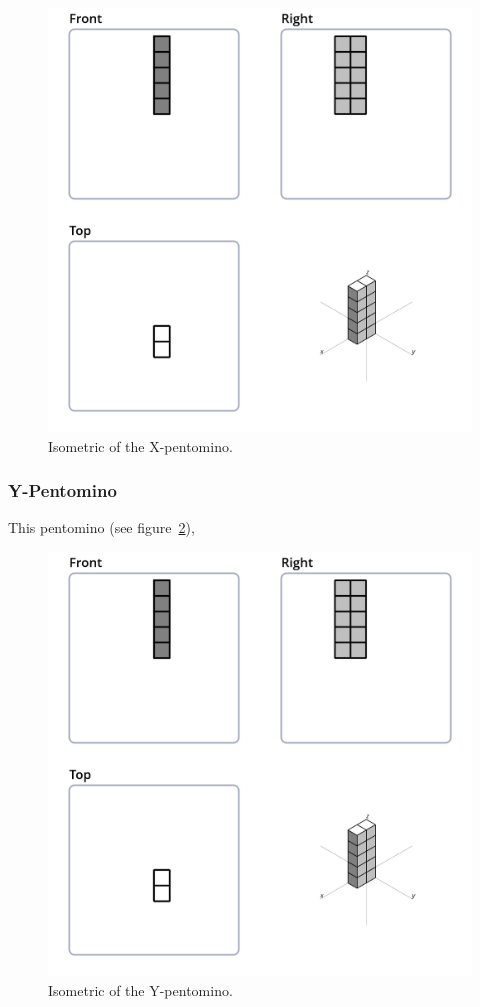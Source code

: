\begin{figure}
	\centering
	\includegraphics[scale=0.3]{iso_diagrams/o.png}
	\caption{Isometric of the X-pentomino.}
  \label{fig:iso-pent-x}
\end{figure}
\subsubsection{Y-Pentomino}
This pentomino (see figure~\ref{fig:iso-pent-y}),


\begin{figure}
	\centering
	\includegraphics[scale=0.3]{iso_diagrams/o.png}
	\caption{Isometric of the Y-pentomino.}
  \label{fig:iso-pent-y}
\end{figure}
